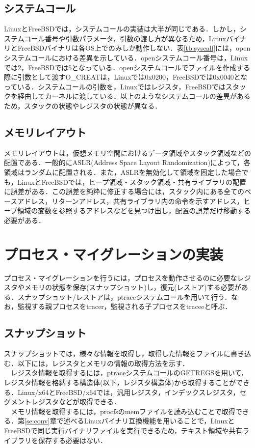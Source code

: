 \documentclass{ipsjpapers}
\begin{document}
\subsection{システムコール}
LinuxとFreeBSDでは，システムコールの実装は大半が同じである．しかし，システムコール番号や引数パラメータ，引数の渡し方が異なるため，LinuxバイナリとFreeBSDバイナリは各OS上でのみしか動作しない．表\ref{tb:syscall}には，openシステムコールにおける差異を示している．openシステムコール番号は，Linuxでは2，FreeBSDでは5となっている．openシステムコールでファイルを作成する際に引数として渡すO\_CREATは，Linuxでは0x0200，FreeBSDでは0x0040となっている．システムコールの引数を，Linuxではレジスタ，FreeBSDではスタックを経由してカーネルに渡している．以上のようなシステムコールの差異があるため，スタックの状態やレジスタの状態が異なる．
\subsection{メモリレイアウト}
メモリレイアウトは，仮想メモリ空間におけるデータ領域やスタック領域などの配置である．一般的にASLR(Address Space Layout Randomization)によって，各領域はランダムに配置される．また，ASLRを無効化して領域を固定した場合でも，LinuxとFreeBSDでは，ヒープ領域・スタック領域・共有ライブラリの配置に誤差がある．この誤差を純粋に修正する場合には，スタック内にある全てのベースアドレス，リターンアドレス，共有ライブラリ内の命令を示すアドレス，ヒープ領域の変数を参照するアドレスなどを見つけ出し，配置の誤差だけ移動する必要がある．

\section{プロセス・マイグレーションの実装}
プロセス・マイグレーションを行うには，プロセスを動作させるのに必要なレジスタやメモリの状態を保存(スナップショット)し，復元(レストア)する必要がある．スナップショット/レストアは，ptraceシステムコールを用いて行う．なお，監視する親プロセスをtracer，監視される子プロセスをtraceeと呼ぶ．
\subsection{スナップショット}
スナップショットでは，様々な情報を取得し，取得した情報をファイルに書き込む．以下には，レジスタとメモリの情報の取得方法を示す．\\
　レジスタ情報を取得するには，ptraceシステムコールのGETREGSを用いて，レジスタ情報を格納する構造体(以下，レジスタ構造体)から取得することができる．Linux\slash{}x64とFreeBSD\slash{}x64では，汎用レジスタ，インデックスレジスタ，セグメントレジスタなどが取得できる．\\
　メモリ情報を取得するには，procfsのmemファイルを読み込むことで取得できる．第\ref{se:conv}章で述べるLinuxバイナリ互換機能を用いることで，LinuxとFreeBSDで同じ実行バイナリファイルを実行できるため，テキスト領域や共有ライブラリを保存する必要はない．
\end{document}
